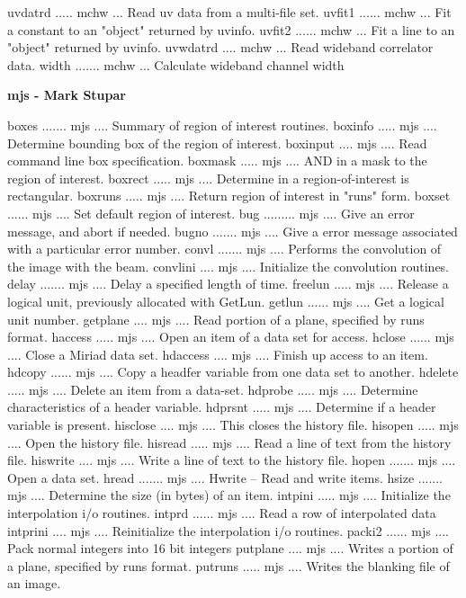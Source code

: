 {\eightpoint\begintt
uvdatrd ..... mchw ... Read uv data from a multi-file set. 
uvfit1 ...... mchw ... Fit a constant to an "object" returned by uvinfo. 
uvfit2 ...... mchw ... Fit a line to an "object" returned by uvinfo. 
uvwdatrd .... mchw ... Read wideband correlator data. 
width ....... mchw ... Calculate wideband channel width 
\endtt}
\par\centerline {\bf mjs - Mark Stupar}
{\eightpoint\begintt
boxes ....... mjs .... Summary of region of interest routines. 
boxinfo ..... mjs .... Determine bounding box of the region of interest. 
boxinput .... mjs .... Read command line box specification. 
boxmask ..... mjs .... AND in a mask to the region of interest. 
boxrect ..... mjs .... Determine in a region-of-interest is rectangular. 
\endtt}
{\eightpoint\begintt
boxruns ..... mjs .... Return region of interest in "runs" form. 
boxset ...... mjs .... Set default region of interest. 
bug ......... mjs .... Give an error message, and abort if needed. 
bugno ....... mjs .... Give a error message associated with a particular error number. 
convl ....... mjs .... Performs the convolution of the image with the beam. 
\endtt}
{\eightpoint\begintt
convlini .... mjs .... Initialize the convolution routines. 
delay ....... mjs .... Delay a specified length of time. 
freelun ..... mjs .... Release a logical unit, previously allocated with GetLun.
getlun ...... mjs .... Get a logical unit number. 
getplane .... mjs .... Read portion of a plane, specified by runs format. 
\endtt}
{\eightpoint\begintt
haccess ..... mjs .... Open an item of a data set for access. 
hclose ...... mjs .... Close a Miriad data set. 
hdaccess .... mjs .... Finish up access to an item. 
hdcopy ...... mjs .... Copy a headfer variable from one data set to another. 
hdelete ..... mjs .... Delete an item from a data-set. 
\endtt}
{\eightpoint\begintt
hdprobe ..... mjs .... Determine characteristics of a header variable. 
hdprsnt ..... mjs .... Determine if a header variable is present. 
hisclose .... mjs .... This closes the history file. 
hisopen ..... mjs .... Open the history file. 
hisread ..... mjs .... Read a line of text from the history file. 
\endtt}
{\eightpoint\begintt
hiswrite .... mjs .... Write a line of text to the history file. 
hopen ....... mjs .... Open a data set. 
hread ....... mjs .... Hwrite -- Read and write items. 
hsize ....... mjs .... Determine the size (in bytes) of an item. 
intpini ..... mjs .... Initialize the interpolation i/o routines. 
\endtt}
{\eightpoint\begintt
intprd ...... mjs .... Read a row of interpolated data 
intprini .... mjs .... Reinitialize the interpolation i/o routines. 
packi2 ...... mjs .... Pack normal integers into 16 bit integers 
putplane .... mjs .... Writes a portion of a plane, specified by runs format. 
putruns ..... mjs .... Writes the blanking file of an image. 
\endtt}
